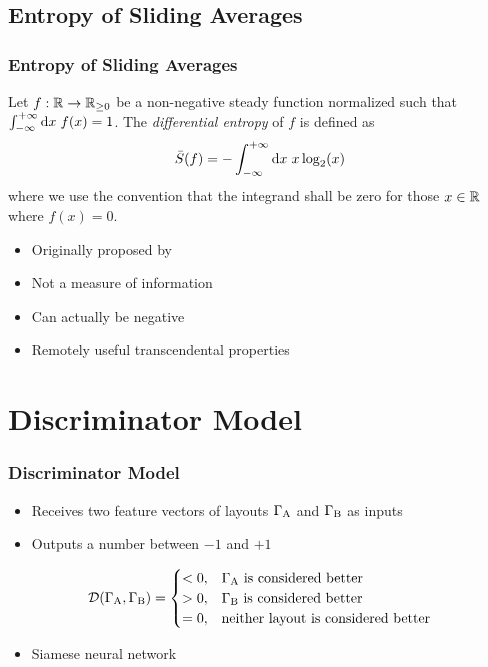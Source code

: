 \documentclass{beamer}
\begin{document}
\subsection{Entropy of Sliding Averages}
\begin{frame}
  \frametitle{Entropy of Sliding Averages}
  \begin{definition}
    Let \(f:\Reals\to\RealsNN\) be a non-negative steady function normalized such that
    \(\int_{-\infty}^{+\infty}\mathrm{d}x\kern0.3emf(x)=1\).  The \emph{differential entropy} of \(f\) is defined as
    \begin{equation*}
      \Entropy*(f) = -\int_{-\infty}^{+\infty} \diff{x} x\log_2(x)
    \end{equation*}
    where we use the convention that the integrand shall be zero for those \(x\in\Reals\) where \(f(x)=0\).
  \end{definition}
  \par\bigskip
  \begin{itemize}
  \item Originally proposed by \textcite{Shannon1948}
  \item Not a measure of information \parencite{Jaynes1963}
  \item Can actually be negative
  \item Remotely useful transcendental properties \parencite{Cover1991}
  \end{itemize}
\end{frame}

\section{Discriminator Model}
\begin{frame}
  \frametitle{Discriminator Model}
  \begin{itemize}
  \item Receives two feature vectors of layouts \(\Gamma_\mathrm{A}\) and \(\Gamma_\mathrm{B}\) as inputs
  \item Outputs a number between \(-1\) and \(+1\)
  \end{itemize}
  \begin{equation*}
    \mathcal{D}(\Gamma_\mathrm{A},\Gamma_\mathrm{B}) =
    \begin{cases}
      <0, & \Gamma_\mathrm{A} \text{ is considered better}\\
      >0, & \Gamma_\mathrm{B} \text{ is considered better}\\
      =0, & \text{neither layout is considered better}
    \end{cases}
  \end{equation*}
  \begin{itemize}
  \item Siamese neural network \parencite{Bromley1994}
  \end{itemize}
\end{frame}
\end{document}
